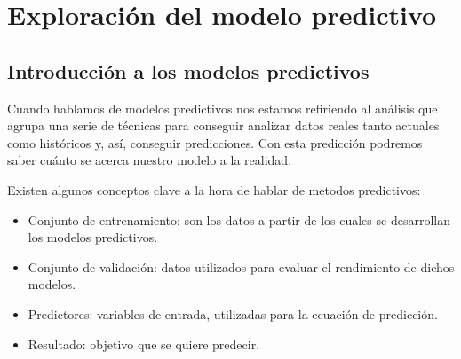 \cleardoublepage

\chapter{Exploración del modelo predictivo}
\label{makereference5}

\section{Introducción a los modelos predictivos}
\label{makereference5.1}

Cuando hablamos de modelos predictivos nos estamos refiriendo al análisis que agrupa una serie de técnicas para conseguir analizar datos reales tanto actuales como históricos y, así, conseguir predicciones. Con esta predicción podremos saber cuánto se acerca nuestro modelo a la realidad.

Existen algunos conceptos clave a la hora de hablar de metodos predictivos:
\begin{itemize}
	\item Conjunto de entrenamiento: son los datos a partir de los cuales se desarrollan los modelos predictivos.
	\item Conjunto de validación: datos utilizados para evaluar el rendimiento de dichos modelos.
	\item Predictores: variables de entrada, utilizadas para la ecuación de predicción. 
	\item Resultado: objetivo que se quiere predecir.
\end{itemize}

